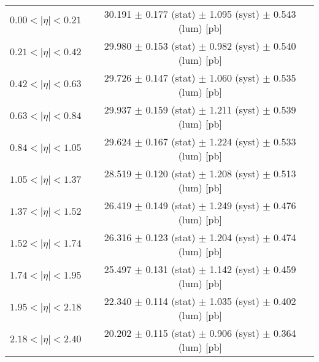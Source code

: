\begin{tabular}{lc}
\hline
$0.00 < |\eta| <0.21$          & 30.191 $\pm$ 0.177 (stat) $\pm$ 1.095 (syst) $\pm$ 0.543 (lum) [pb]  \\
$0.21 < |\eta| <0.42$          & 29.980 $\pm$ 0.153 (stat) $\pm$ 0.982 (syst) $\pm$ 0.540 (lum) [pb]  \\
$0.42 < |\eta| <0.63$          & 29.726 $\pm$ 0.147 (stat) $\pm$ 1.060 (syst) $\pm$ 0.535 (lum) [pb]  \\
$0.63 < |\eta| <0.84$          & 29.937 $\pm$ 0.159 (stat) $\pm$ 1.211 (syst) $\pm$ 0.539 (lum) [pb]  \\
$0.84 < |\eta| <1.05$          & 29.624 $\pm$ 0.167 (stat) $\pm$ 1.224 (syst) $\pm$ 0.533 (lum) [pb]  \\
$1.05 < |\eta| <1.37$          & 28.519 $\pm$ 0.120 (stat) $\pm$ 1.208 (syst) $\pm$ 0.513 (lum) [pb]  \\
$1.37 < |\eta| <1.52$          & 26.419 $\pm$ 0.149 (stat) $\pm$ 1.249 (syst) $\pm$ 0.476 (lum) [pb]  \\
$1.52 < |\eta| <1.74$          & 26.316 $\pm$ 0.123 (stat) $\pm$ 1.204 (syst) $\pm$ 0.474 (lum) [pb]  \\
$1.74 < |\eta| <1.95$          & 25.497 $\pm$ 0.131 (stat) $\pm$ 1.142 (syst) $\pm$ 0.459 (lum) [pb]  \\
$1.95 < |\eta| <2.18$          & 22.340 $\pm$ 0.114 (stat) $\pm$ 1.035 (syst) $\pm$ 0.402 (lum) [pb]  \\
$2.18 < |\eta| <2.40$          & 20.202 $\pm$ 0.115 (stat) $\pm$ 0.906 (syst) $\pm$ 0.364 (lum) [pb]  \\
\hline
\end{tabular}

